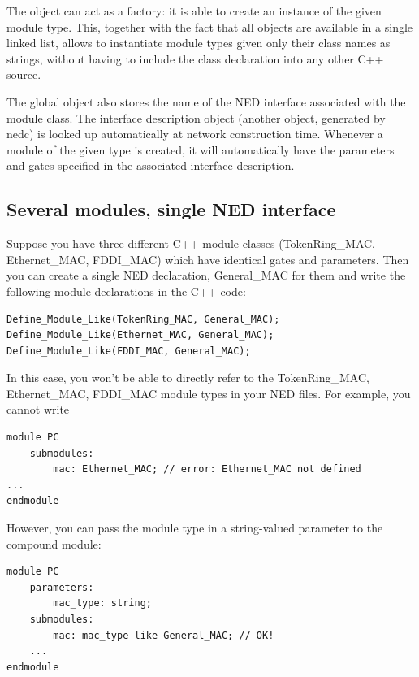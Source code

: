 The  object can act as a factory: it is able to
create an instance of the given module type. This, together with the
fact that all  objects are available in a single
linked list, allows {\opp} to instantiate module types given only
their class names as strings, without having to include the class
declaration into any other C++ source.


The global object also stores the name of the NED
interface associated with the module class. The
interface description object
(another object, generated by nedc) is looked up automatically at
network construction time. Whenever a module of the given type is
created, it will automatically have the parameters and gates specified
in the associated interface description.





\subsection{Several modules, single NED interface}

Suppose you have three different C++ module classes (TokenRing\_MAC,
Ethernet\_MAC, FDDI\_MAC) which have identical gates and parameters.
Then you can create a single NED declaration, General\_MAC for them
and write the following module declarations in the C++ code:

\begin{verbatim}
Define_Module_Like(TokenRing_MAC, General_MAC);
Define_Module_Like(Ethernet_MAC, General_MAC);
Define_Module_Like(FDDI_MAC, General_MAC);
\end{verbatim}

In this case, you won't be able to directly refer to the
TokenRing\_MAC, Ethernet\_MAC, FDDI\_MAC module types in your NED
files. For example, you cannot write

\begin{verbatim}
module PC
    submodules:
        mac: Ethernet_MAC; // error: Ethernet_MAC not defined
...
endmodule
\end{verbatim}


However, you can pass the module type in a string-valued parameter to
the compound module:

\begin{verbatim}
module PC
    parameters:
        mac_type: string;
    submodules:
        mac: mac_type like General_MAC; // OK!
    ...
endmodule
\end{verbatim}


